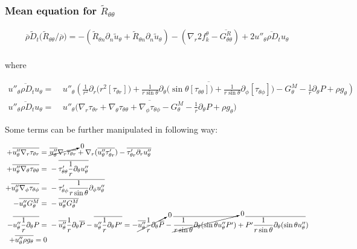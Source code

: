 \documentclass[10pt,paper=a4]{report}
\newcommand{\eht}{\overline}
\newcommand{\fht}{\widetilde}
\begin{document}
\subsubsection{Mean equation for $\fht{R}_{\theta \theta}$}

\begin{align}
\eht{\rho}\fht{D}_t \big( \fht{R}_{\theta \theta} / \eht{\rho} \big) = -\left(\fht{R}_{\theta n}\partial_n \fht{u}_\theta + \fht{R}_{\theta n}\partial_n \fht{u}_\theta \right) -\left( \nabla_r 2 f_k^\theta - \eht{G_{\theta \theta}^R} \right) + 2  \eht{u''_\theta \rho D_t u_\theta} \\
\end{align}

\noindent
where

\begin{align}
\eht{u''_\theta \rho D_t u_\theta} = & \ \eht{u''_\theta \left( \frac{1}{r^{2}} \partial_{r} \big(r^{2} [\tau_{\theta r}]\big) + \frac{1}{r\sin{\theta}}\partial_{\theta}\big(\sin{\theta}[\tau_{\theta \theta}]\big) + \frac{1}{r\sin{\theta}}\partial_{\phi}[\tau_{\theta \phi}]\big) - G_\theta^M - \frac{1}{r} \partial_{\theta} P + \rho g_\theta \right) } \\
\eht{u''_\theta \rho D_t u_\theta} = & \ \eht{u''_\theta \big( \nabla_r \tau_{\theta r} + \nabla_\theta \tau_{\theta \theta} + \nabla_\phi \tau_{\theta \phi} - G_\theta^M - \frac{1}{r} \partial_{\theta} P + \rho g_\theta \big) }
\end{align}

\noindent
Some terms can be further manipulated in following way:

\begin{align}
+\eht{u''_\theta \nabla_r \tau_{\theta r}} = & \ \cancelto{0}{\eht{u''_\theta}\nabla_r \eht{\tau_{\theta r}}} + \nabla_r (\eht{u''_\theta \tau'_{\theta r}}) - \eht{\tau'_{\theta r}\partial_r u''_\theta}\\
+\eht{u''_\theta \nabla_\theta \tau_{\theta \theta}} = & \ -\eht{\tau'_{\theta \theta} \frac{1}{r}\partial_\theta u''_\theta} \\
+\eht{u''_\theta \nabla_\phi \tau_{\theta \phi}} = & \ -\eht{\tau'_{\theta \phi} \frac{1}{r\sin{\theta}} \partial_\phi u''_\theta} \\
-\eht{u''_\theta G_\theta^M} = & \ -\eht{u''_\theta G_\theta^M} \\
-\eht{u''_\theta \frac{1}{r}\partial_\theta P } = & \ -\eht{u''_\theta}\frac{1}{r}\partial_\theta \eht{P} - \eht{u''_\theta \frac{1}{r}\partial_\theta P'} = -\cancelto{0}{\eht{u''_\theta}\frac{1}{r}\partial_\theta \eht{P}} - \cancelto{0}{\eht{\frac{1}{r\sin{\theta}}\partial_\theta (\sin{\theta} u''_\theta P')}} + \eht{P'\frac{1}{r\sin{\theta}}\partial_\theta (\sin{\theta}u''_\theta}) \\
+\eht{u''_\theta \rho g_\theta} = 0 & \ 
\end{align}
\end{document}
